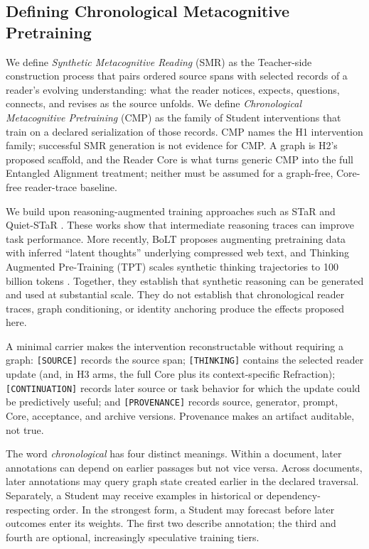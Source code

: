 \documentclass[11pt]{article}
\begin{document}
\subsection{Defining Chronological Metacognitive Pretraining}\label{sec:cmp-definition}

We define \emph{Synthetic Metacognitive Reading} (SMR) as the Teacher-side
construction process that pairs ordered source spans with selected records of a
reader's evolving understanding: what the reader notices, expects, questions,
connects, and revises as the source unfolds. We define \emph{Chronological
Metacognitive Pretraining} (CMP) as the family of Student interventions that
train on a declared serialization of those records. CMP names the H1
intervention family; successful SMR generation is not evidence for CMP. A graph
is H2's proposed scaffold, and the Reader Core is what turns generic CMP into the
full Entangled Alignment treatment; neither must be assumed for a graph-free,
Core-free reader-trace baseline.

We build upon reasoning-augmented training approaches such as STaR \cite{zelikman2022star} and Quiet-STaR \cite{zelikman2024quietstar}. These works show that intermediate reasoning traces can improve task performance. More recently, BoLT \cite{ruan2025bolt} proposes augmenting pretraining data with inferred ``latent thoughts'' underlying compressed web text, and Thinking Augmented Pre-Training (TPT) scales synthetic thinking trajectories to 100 billion tokens \cite{nvidia2025tpt}. Together, they establish that synthetic reasoning can be generated and used at substantial scale. They do not establish that chronological reader traces, graph conditioning, or identity anchoring produce the effects proposed here.

A minimal carrier makes the intervention reconstructable without requiring a
graph: \texttt{[SOURCE]} records the source span; \texttt{[THINKING]} contains
the selected reader update (and, in H3 arms, the full Core plus its
context-specific Refraction); \texttt{[CONTINUATION]} records later source or
task behavior for which the update could be predictively useful; and
\texttt{[PROVENANCE]} records source, generator, prompt, Core, acceptance, and
archive versions. Provenance makes an artifact auditable, not true.

The word \emph{chronological} has four distinct meanings. Within a document,
later annotations can depend on earlier passages but not vice versa. Across
documents, later annotations may query graph state created earlier in the
declared traversal. Separately, a Student may receive examples in historical or
dependency-respecting order. In the strongest form, a Student may forecast
before later outcomes enter its weights. The first two describe annotation; the
third and fourth are optional, increasingly speculative training tiers.
\end{document}
